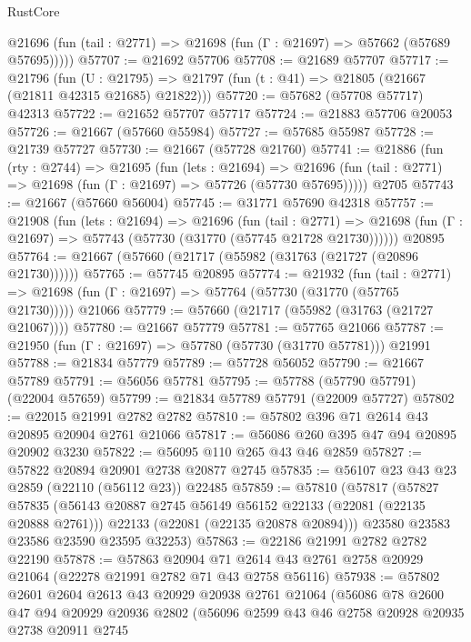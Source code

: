 \begin{lexlean}{RustCore}
\begin{coremodule}
      @21696 (fun (tail : @2771) => @21698 (fun (Γ : @21697) => @57662 (@57689 @57695)))))
@57707 := @21692 @57706
@57708 := @21689 @57707
@57717 := @21796
    (fun (U : @21795) => @21797 (fun (t : @41) => @21805 (@21667 (@21811 @42315 @21685) @21822)))
@57720 := @57682 (@57708 @57717) @42313
@57722 := @21652 @57707 @57717
@57724 := @21883 @57706 @20053
@57726 := @21667 (@57660 @55984)
@57727 := @57685 @55987
@57728 := @21739 @57727
@57730 := @21667 (@57728 @21760)
@57741 := @21886
    (fun (rty : @2744) =>
    @21695
      (fun (lets : @21694) =>
      @21696 (fun (tail : @2771) => @21698 (fun (Γ : @21697) => @57726 (@57730 @57695)))))
    @2705
@57743 := @21667 (@57660 @56004)
@57745 := @31771 @57690 @42318
@57757 := @21908
    (fun (lets : @21694) =>
    @21696
      (fun (tail : @2771) =>
      @21698 (fun (Γ : @21697) => @57743 (@57730 (@31770 (@57745 @21728 @21730))))))
    @20895
@57764 := @21667 (@57660 (@21717 (@55982 (@31763 (@21727 (@20896 @21730))))))
@57765 := @57745 @20895
@57774 := @21932
    (fun (tail : @2771) => @21698 (fun (Γ : @21697) => @57764 (@57730 (@31770 (@57765 @21730)))))
    @21066
@57779 := @57660 (@21717 (@55982 (@31763 (@21727 @21067))))
@57780 := @21667 @57779
@57781 := @57765 @21066
@57787 := @21950 (fun (Γ : @21697) => @57780 (@57730 (@31770 @57781))) @21991
@57788 := @21834 @57779
@57789 := @57728 @56052
@57790 := @21667 @57789
@57791 := @56056 @57781
@57795 := @57788 (@57790 @57791) (@22004 @57659)
@57799 := @21834 @57789 @57791 (@22009 @57727)
@57802 := @22015 @21991 @2782 @2782
@57810 := @57802 @396 @71 @2614 @43 @20895 @20904 @2761 @21066
@57817 := @56086 @260 @395 @47 @94 @20895 @20902 @3230
@57822 := @56095 @110 @265 @43 @46 @2859
@57827 := @57822 @20894 @20901 @2738 @20877 @2745
@57835 := @56107 @23 @43 @23 @2859 (@22110 (@56112 @23)) @22485
@57859 := @57810
    (@57817
      (@57827
        @57835
        (@56143 @20887 @2745 @56149 @56152 @22133 (@22081 (@22135 @20888 @2761)))
        @22133
        (@22081 (@22135 @20878 @20894)))
      @23580
      @23583
      @23586
      @23590
      @23595
      @32253)
@57863 := @22186 @21991 @2782 @2782 @22190
@57878 := @57863
    @20904
    @71
    @2614
    @43
    @2761
    @2758
    @20929
    @21064
    (@22278 @21991 @2782 @71 @43 @2758 @56116)
@57938 := @57802
    @2601
    @2604
    @2613
    @43
    @20929
    @20938
    @2761
    @21064
    (@56086
      @78
      @2600
      @47
      @94
      @20929
      @20936
      @2802
      (@56096
        @2599
        @43
        @46
        @2758
        @20928
        @20935
        @2738
        @20911
        @2745

\end{coremodule}
\end{lexlean}
